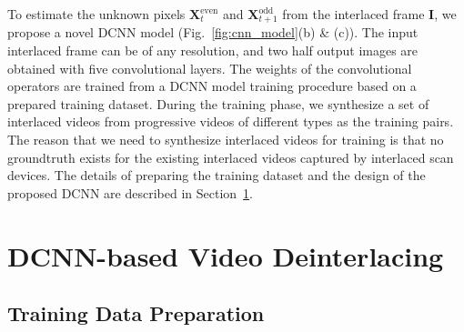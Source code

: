 \documentclass[acmtog]{acmart}
\begin{document}
To estimate the unknown pixels $\mathbf{X}^{\text{even}}_t$ and
$\mathbf{X}^{\text{odd}}_{t+1}$ from the interlaced frame $\mathbf{I}$, we
propose a novel DCNN model (Fig.~\ref{fig:cnn_model}(b) \& (c)). The input
interlaced frame can be of any resolution, and two half output images are
obtained with five convolutional layers. The weights of the convolutional
operators are trained from a DCNN model training procedure based on a prepared
training dataset. During the training phase, we synthesize a set of interlaced
videos from progressive videos of different types as the training pairs. The
reason that we need to synthesize interlaced videos for training is that no
groundtruth exists for the existing interlaced videos captured by interlaced
scan devices. The details of preparing the training dataset and the design
of the proposed DCNN are described in Section~\ref{sec:deinterlacing}.  \section{DCNN-based Video Deinterlacing}\label{sec:deinterlacing}
\subsection{Training Data Preparation}
\end{document}

